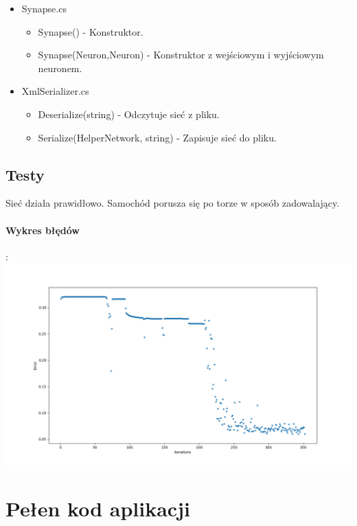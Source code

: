 \documentclass[12pt,a4paper]{article}
\begin{document}
\begin{itemize}
\begin{itemize}
			\end{itemize}
		\item Synapse.cs
			\begin{itemize}
				\item Synapse() - Konstruktor.
				\item Synapse(Neuron,Neuron) - Konstruktor z wejściowym i wyjściowym neuronem.
			\end{itemize}
		\item XmlSerializer.cs
			\begin{itemize}
				\item Deserialize(string) - Odczytuje sieć z pliku.
				\item Serialize(HelperNetwork, string) - Zapisuje sieć do pliku.
			\end{itemize}
	\end{itemize}

	\subsection{Testy}
	Sieć działa prawidłowo. Samochód porusza się po torze w sposób zadowalający.	\\
	\paragraph{Wykres błędów}:\\
	\includegraphics[scale=0.5]{supa_wykres}
	\newpage
	\section{Pełen kod aplikacji}
\end{document}
